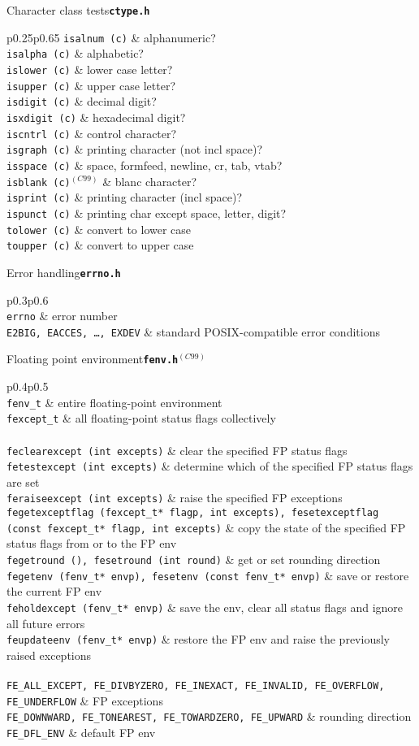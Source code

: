 \documentclass{article}
\newcommand{\newstd}{\ensuremath{^{(C99)}}\xspace}
\newcommand{\librarysection}[5]{{\vspace{2ex}\large #1\quad\textbf{\texttt{#2}}}\par\begin{supertabular}{p{#3\linewidth}p{#4\linewidth}}#5\end{supertabular}}
\newcommand{\funcdescription}[2]{\texttt{#1} & #2 \\}
\newcommand{\smallheader}[1]{\multicolumn{2}{c}{#1} \\}
\begin{document}
\begin{multicols*}{3}
\librarysection{Character class tests}{ctype.h}{0.25}{0.65}{
\funcdescription{isalnum (c)}{alphanumeric?}
\funcdescription{isalpha (c)}{alphabetic?}
\funcdescription{islower (c)}{lower case letter?}
\funcdescription{isupper (c)}{upper case letter?}
\funcdescription{isdigit (c)}{decimal digit?}
\funcdescription{isxdigit (c)}{hexadecimal digit?}
\funcdescription{iscntrl (c)}{control character?}
\funcdescription{isgraph (c)}{printing character (not incl space)?}
\funcdescription{isspace (c)}{space, formfeed, newline, cr, tab, vtab?}
\funcdescription{isblank (c)\newstd}{blanc character?}
\funcdescription{isprint (c)}{printing character (incl space)?}
\funcdescription{ispunct (c)}{printing char except space, letter, digit?}
\funcdescription{tolower (c)}{convert to lower case}
\funcdescription{toupper (c)}{convert to upper case}
}

\librarysection{Error handling}{errno.h}{0.3}{0.6}{
\smallheader{\underline{Macros}}
\funcdescription{errno}{error number}
\funcdescription{E2BIG, EACCES, \dots, EXDEV}{standard POSIX-compatible error conditions}
}

\librarysection{Floating point environment}{fenv.h\newstd}{0.4}{0.5}{
\smallheader{\underline{Types}}
\funcdescription{fenv\_t}{entire floating-point environment}
\funcdescription{fexcept\_t}{all floating-point status flags collectively}
\smallheader{\underline{Functions}}
\funcdescription{feclearexcept (int excepts)}{clear the specified FP status flags}
\funcdescription{fetestexcept (int excepts)}{determine which of the specified FP status flags are set}
\funcdescription{feraiseexcept (int excepts)}{raise the specified FP exceptions}
\funcdescription{fegetexceptflag (fexcept\_t* flagp, int excepts), fesetexceptflag (const fexcept\_t* flagp, int excepts)}{copy the state of the specified FP status flags from or to the FP env}
\funcdescription{fegetround (), fesetround (int round)}{get or set rounding direction}
\funcdescription{fegetenv (fenv\_t* envp), fesetenv (const fenv\_t* envp)}{save or restore the current FP env}
\funcdescription{feholdexcept (fenv\_t* envp)}{save the env, clear all status flags and ignore all future errors}
\funcdescription{feupdateenv (fenv\_t* envp)}{restore the FP env and raise the previously raised exceptions}
\smallheader{\underline{Macros}}
\funcdescription{FE\_ALL\_EXCEPT, FE\_DIVBYZERO, FE\_INEXACT, FE\_INVALID, FE\_OVERFLOW, FE\_UNDERFLOW}{FP exceptions}
\funcdescription{FE\_DOWNWARD, FE\_TONEAREST, FE\_TOWARDZERO, FE\_UPWARD}{rounding direction}
\funcdescription{FE\_DFL\_ENV}{default FP env}
}


\end{multicols*}
\end{document}

